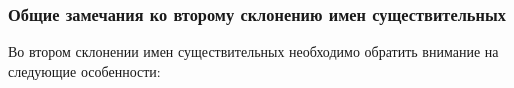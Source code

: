 \documentclass[11pt,a4paper,oneside]{memoir}
\begin{document}
                \subsubsection{Общие замечания ко второму склонению имен существительных}

    Во втором склонении имен существительных необходимо обратить внимание на следующие особенности:

\end{document}
